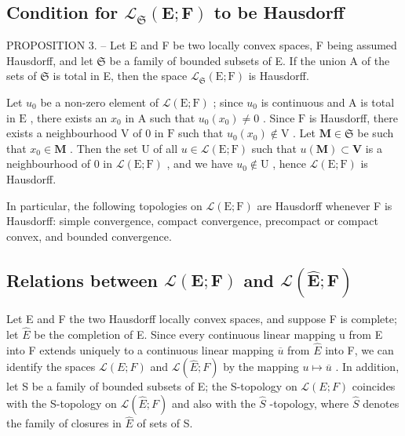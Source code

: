 \subsection{\texorpdfstring{Condition for \(\mathcal{L}_{\mathfrak{S}}(\mathbf{E};\mathbf{F})\) to be Hausdorff}{Condition for \textbackslash mathcal\{L\}\_\{\textbackslash mathfrak\{S\}\}(\textbackslash mathbf\{E\};\textbackslash mathbf\{F\}) to be Hausdorff}}

PROPOSITION 3. -- Let E and F be two locally convex spaces, F being assumed Hausdorff, and let \(\mathfrak{S}\) be a family of bounded subsets of E. If the union A of the sets of \(\mathfrak{S}\) is total in E, then the space \(\mathcal{L}_{\mathfrak{S}}(\mathrm{E};\mathrm{F})\) is Hausdorff.

Let \(u_0\) be a non-zero element of \(\mathcal{L}(\mathrm{E};\mathrm{F})\) ; since \(u_0\) is continuous and \(\mathrm{A}\) is total in \(\mathrm{E}\) , there exists an \(x_0\) in \(\mathrm{A}\) such that \(u_0(x_0) \neq 0\) . Since \(\mathrm{F}\) is Hausdorff, there exists a neighbourhood \(\mathrm{V}\) of 0 in \(\mathrm{F}\) such that \(u_0(x_0) \notin \mathrm{V}\) . Let \(\mathbf{M} \in \mathfrak{S}\) be such that \(x_0 \in \mathbf{M}\) . Then the set \(\mathrm{U}\) of all \(u \in \mathcal{L}(\mathrm{E};\mathrm{F})\) such that \(u(\mathbf{M}) \subset \mathbf{V}\) is a neighbourhood of 0 in \(\mathcal{L}(\mathrm{E};\mathrm{F})\) , and we have \(u_0 \notin \mathrm{U}\) , hence \(\mathcal{L}(\mathrm{E};\mathrm{F})\) is Hausdorff.

In particular, the following topologies on \(\mathcal{L}(\mathrm{E};\mathrm{F})\) are Hausdorff whenever F is Hausdorff: simple convergence, compact convergence, precompact or compact convex, and bounded convergence.

\subsection{\texorpdfstring{Relations between \(\mathcal{L}(\mathbf{E};\mathbf{F})\) and \(\mathcal{L}(\hat{\mathbf{E}};\mathbf{F})\)}{Relations between \textbackslash mathcal\{L\}(\textbackslash mathbf\{E\};\textbackslash mathbf\{F\}) and \textbackslash mathcal\{L\}(\textbackslash hat\{\textbackslash mathbf\{E\}\};\textbackslash mathbf\{F\})}}

Let E and F the two Hausdorff locally convex spaces, and suppose F is complete; let \(\hat{E}\) be the completion of E. Since every continuous linear mapping u from E into F extends uniquely to a continuous linear mapping \(\overline{u}\) from \(\hat{E}\) into F, we can identify the spaces \(\mathcal{L}(E;F)\) and \(\mathcal{L}(\hat{E};F)\) by the mapping \(u\mapsto\overline{u}\) . In addition, let S be a family of bounded subsets of E; the S-topology on \(\mathcal{L}(E;F)\) coincides with the S-topology on \(\mathcal{L}(\hat{E};F)\) and also with the \(\hat{S}\) -topology, where \(\hat{S}\) denotes the family of closures in \(\hat{E}\) of sets of S.

